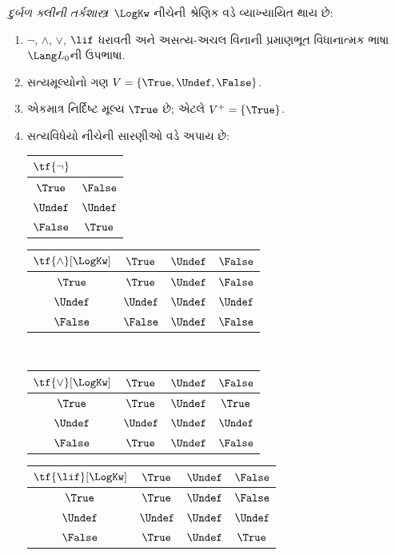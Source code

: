 \begin{defn}
\emph{દુર્બળ ક્લીની તર્કશાસ્ત્ર}~$\LogKw$ નીચેની શ્રેણિક વડે વ્યાખ્યાયિત થાય છે:
\begin{enumerate}
  \item $\lnot$, $\land$, $\lor$, $\lif$ ધરાવતી અને
  અસત્ય-અચલ વિનાની પ્રમાણભૂત વિધાનાત્મક ભાષા~$\Lang L_0$ની ઉપભાષા.
  \item સત્યમૂલ્યોનો ગણ $V = \{\True, \Undef, \False\}$.
  \item એકમાત્ર નિર્દિષ્ટ મૂલ્ય $\True$ છે; એટલે $V^+ = \{\True\}$.
  \item સત્યવિધેયો નીચેની સારણીઓ વડે અપાય છે:
  \begin{center}
    \begin{tabular}{c|c}
      $\tf{\lnot}$ & \\
      \hline
      $\True$ & $\False$ \\
      $\Undef$ & $\Undef$ \\
      $\False$ & $\True$
    \end{tabular}
    \quad
    \begin{tabular}{c|ccc}
      $\tf{\land}[\LogKw]$ & $\True$ & $\Undef$ & $\False$ \\
      \hline
      $\True$ & $\True$ & $\Undef$ & $\False$ \\
      $\Undef$ & $\Undef$ & $\Undef$ & $\Undef$\\
      $\False$ & $\False$ & $\Undef$ & $\False$
    \end{tabular}
    \\[2ex]
    \begin{tabular}{c|ccc}
      $\tf{\lor}[\LogKw]$ & $\True$ & $\Undef$ & $\False$ \\
      \hline
      $\True$ & $\True$ & $\Undef$ & $\True$ \\
      $\Undef$ & $\Undef$ & $\Undef$ & $\Undef$ \\
      $\False$ & $\True$ & $\Undef$ & $\False$
    \end{tabular}
    \quad
    \begin{tabular}{c|ccc}
      $\tf{\lif}[\LogKw]$ & $\True$ & $\Undef$ & $\False$ \\
      \hline
      $\True$ & $\True$ & $\Undef$ & $\False$ \\
      $\Undef$ & $\Undef$ & $\Undef$ & $\Undef$ \\
      $\False$ & $\True$ & $\Undef$ & $\True$
    \end{tabular}
  \end{center}
\end{enumerate}
\end{defn}

